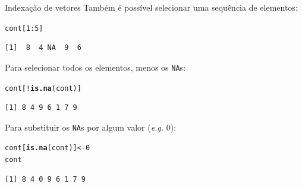 \documentclass[10pt,handout]{beamer}\usepackage[]{graphicx}\usepackage[]{color}
\makeatletter
\newcommand{\hlnum}[1]{\textcolor[rgb]{0.686,0.059,0.569}{#1}}%
\newcommand{\hlopt}[1]{\textcolor[rgb]{0,0,0}{#1}}%
\newcommand{\hlstd}[1]{\textcolor[rgb]{0.345,0.345,0.345}{#1}}%
\newcommand{\hlkwb}[1]{\textcolor[rgb]{0.69,0.353,0.396}{#1}}%
\newcommand{\hlkwd}[1]{\textcolor[rgb]{0.737,0.353,0.396}{\textbf{#1}}}%
\newenvironment{kframe}{%
 \def\at@end@of@kframe{}%
 \ifinner\ifhmode%
  \def\at@end@of@kframe{\end{minipage}}%
  \begin{minipage}{\columnwidth}%
 \fi\fi%
 \def\FrameCommand##1{\hskip\@totalleftmargin \hskip-\fboxsep
 \colorbox{shadecolor}{##1}\hskip-\fboxsep
     \hskip-\linewidth \hskip-\@totalleftmargin \hskip\columnwidth}%
 \MakeFramed {\advance\hsize-\width
   \@totalleftmargin\z@ \linewidth\hsize
   \@setminipage}}%
 {\par\unskip\endMakeFramed%
 \at@end@of@kframe}
\newenvironment{knitrout}{}{} %
\makeatother
\begin{document}
\begin{frame}[fragile]{Indexação de vetores}
Também é possível selecionar uma sequência de elementos:
\begin{knitrout}\small
{}\color{fgcolor}\begin{kframe}
\begin{alltt}
\hlstd{cont[}\hlnum{1}\hlopt{:}\hlnum{5}\hlstd{]}
\end{alltt}
\begin{verbatim}
[1]  8  4 NA  9  6
\end{verbatim}
\end{kframe}
\end{knitrout}
Para selecionar todos os elementos, menos os \texttt{NA}s:
\begin{knitrout}\small
{}\color{fgcolor}\begin{kframe}
\begin{alltt}
\hlstd{cont[}\hlopt{!}\hlkwd{is.na}\hlstd{(cont)]}
\end{alltt}
\begin{verbatim}
[1] 8 4 9 6 1 7 9
\end{verbatim}
\end{kframe}
\end{knitrout}
Para substituir os \texttt{NA}s por algum valor (\textit{e.g.} 0):
\begin{knitrout}\small
{}\color{fgcolor}\begin{kframe}
\begin{alltt}
\hlstd{cont[}\hlkwd{is.na}\hlstd{(cont)]} \hlkwb{<-} \hlnum{0}
\hlstd{cont}
\end{alltt}
\begin{verbatim}
[1] 8 4 0 9 6 1 7 9
\end{verbatim}
\end{kframe}
\end{knitrout}
\end{frame}
\end{document}
